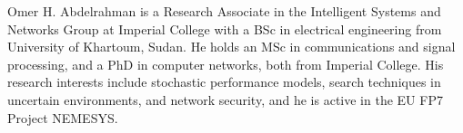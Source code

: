\documentclass[journal]{IEEEtran}
\begin{document}
\begin{biographynophoto}{Omer H. Abdelrahman}
is a Research Associate in the Intelligent Systems and Networks Group at Imperial College with a BSc in electrical engineering from University of Khartoum, Sudan. He holds an MSc in communications and signal processing, and a PhD in computer networks, both from Imperial College. His research interests include stochastic performance models, search techniques in uncertain environments, and network security, and he is active in the EU FP7 Project NEMESYS.
\end{biographynophoto}
\end{document}
